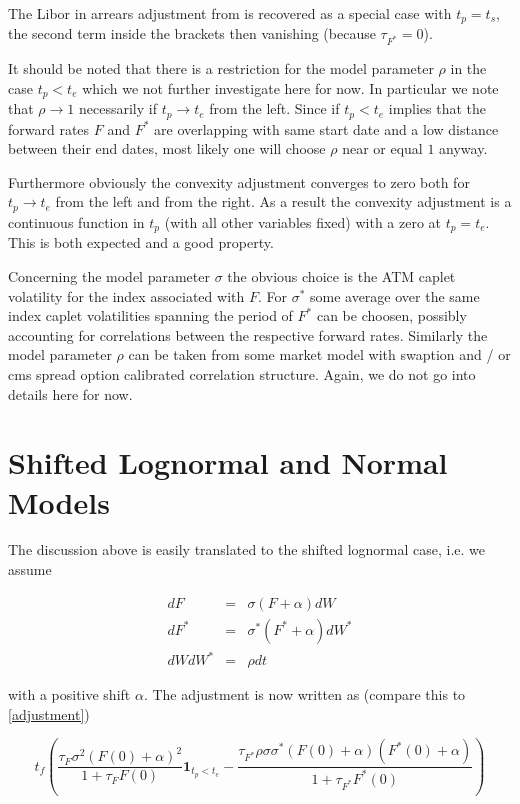 \documentclass{amsart}
\theoremstyle{plain}
\numberwithin{equation}{section}
\begin{document}
The Libor in arrears adjustment from \cite{Hfb} is recovered as a special case with $t_p=t_s$, the second term inside the brackets then vanishing (because $\tau_{F^*}=0$).

It should be noted that there is a restriction for the model parameter $\rho$ in the case $t_p < t_e$ which we not further investigate here for now. In particular we note that $\rho \rightarrow 1$ necessarily if $t_p \rightarrow t_e$ from the left. Since if $t_p < t_e$ implies that the forward rates $F$ and
$F^*$ are overlapping with same start date and a low distance between their end dates, most likely one will choose $\rho$ near or equal $1$ anyway.

Furthermore obviously the convexity adjustment converges to zero both for $t_p \rightarrow t_e$ from the left and from the right. As a result the convexity
adjustment is a continuous function in $t_p$ (with all other variables fixed) with a zero at $t_p = t_e$. This is both expected and a good property.

Concerning the model parameter $\sigma$ the obvious choice is the ATM caplet volatility for the index associated with $F$. For $\sigma^*$ some average
over the same index caplet volatilities spanning the period of $F^*$ can be choosen, possibly accounting for correlations between the respective forward rates. Similarly the model parameter $\rho$ can be taken from some market model with swaption and / or cms spread option calibrated correlation structure. Again, we do not go into details here for now.

\section{Shifted Lognormal and Normal Models}

The discussion above is easily translated to the shifted lognormal case, i.e. we assume

\begin{eqnarray}\label{model_sln}
dF &=& \sigma (F+\alpha) dW \\
dF^* &=& \sigma^* (F^*+\alpha) dW^* \\
dW dW^* &=& \rho dt
\end{eqnarray}

with a positive shift $\alpha$. The adjustment is now written as (compare this to \ref{adjustment})

\begin{equation}
t_f\left(\frac{\tau_F \sigma^2 (F(0)+\alpha)^2}{1+\tau_F F(0)} \textbf{1}_{t_p<t_e} - \frac{\tau_{F^*} \rho\sigma\sigma^*(F(0)+\alpha)(F^*(0)+\alpha)}{1+\tau_{F^*} F^*(0)}\right)
\end{equation}
\end{document}
